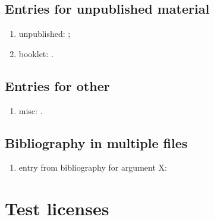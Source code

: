 \subsection{Entries for unpublished material}

\begin{enumerate}
\item unpublished: \cite{author2023unpublished};
\item booklet: \cite{author2023booklet}.
\end{enumerate}

\subsection{Entries for other} 

\begin{enumerate}
\item misc: \cite{author2023misc}.
\end{enumerate}

\subsection{Bibliography in multiple files}

\begin{enumerate}
\item entry from bibliography for argument X: \cite{x2023misc}
\end{enumerate}

\section{Test licenses}

